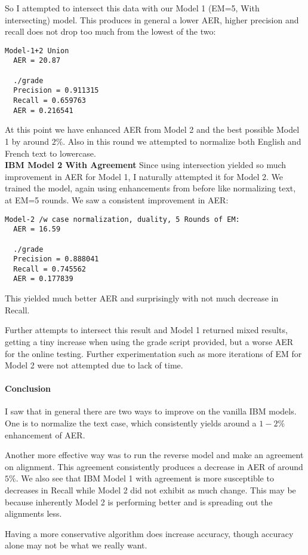 \documentclass{article}
\begin{document}
So I attempted to intersect this data with our Model 1 (EM=5, With intersecting) model. This produces in general a lower AER, higher precision and recall does not drop too much from the lowest of the two:

\begin{verbatim}
Model-1+2 Union
  AER = 20.87
  
  ./grade
  Precision = 0.911315
  Recall = 0.659763
  AER = 0.216541
\end{verbatim}

At this point we have enhanced AER from Model 2 and the best possible Model 1 by around $2\%$. Also in this round we attempted to normalize both English and French text to lowercase. \\

{\bf IBM Model 2 With Agreement} Since using intersection yielded so much improvement in AER for Model 1, I naturally attempted it for Model 2. We trained the model, again using enhancements from before like normalizing text, at EM=5 rounds. We saw a consistent improvement in AER:

\begin{verbatim}
Model-2 /w case normalization, duality, 5 Rounds of EM:
  AER = 16.59
  
  ./grade
  Precision = 0.888041
  Recall = 0.745562
  AER = 0.177839
\end{verbatim}

This yielded much better AER and surprisingly with not much decrease in Recall.

Further attempts to intersect this result and Model 1 returned mixed results, getting a tiny increase when using the grade script provided, but a worse AER for the online testing. Further experimentation such as more iterations of EM for Model 2 were not attempted due to lack of time.

\paragraph{Conclusion}
I saw that in general there are two ways to improve on the vanilla IBM models. One is to normalize the text case, which consistently yields around a $1-2\%$ enhancement of AER. 

Another more effective way was to run the reverse model and make an agreement on alignment. This agreement consistently produces a decrease in AER of around $5\%$. We also see that IBM Model 1 with agreement is more susceptible to decreases in Recall while Model 2 did not exhibit as much change. This may be because inherently Model 2 is performing better and is spreading out the alignments less.

Having a more conservative algorithm does increase accuracy, though accuracy alone may not be what we really want.

\end{document}
